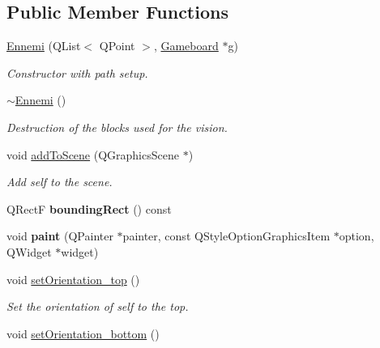 \subsection*{Public Member Functions}
\begin{DoxyCompactItemize}
\item 
\hyperlink{class_ennemi_af86e9134a1cfd8d878305924702b9d7a}{Ennemi} (Q\+List$<$ Q\+Point $>$, \hyperlink{class_gameboard}{Gameboard} $\ast$g)
\begin{DoxyCompactList}\small\item\em Constructor with path setup. \end{DoxyCompactList}\item 
\hypertarget{class_ennemi_adf402a9389efe705c604f91d6e74d00e}{}\hyperlink{class_ennemi_adf402a9389efe705c604f91d6e74d00e}{$\sim$\+Ennemi} ()\label{class_ennemi_adf402a9389efe705c604f91d6e74d00e}

\begin{DoxyCompactList}\small\item\em Destruction of the blocks used for the vision. \end{DoxyCompactList}\item 
\hypertarget{class_ennemi_ae62d1dcf274319710e7ac4495c95a221}{}void \hyperlink{class_ennemi_ae62d1dcf274319710e7ac4495c95a221}{add\+To\+Scene} (Q\+Graphics\+Scene $\ast$)\label{class_ennemi_ae62d1dcf274319710e7ac4495c95a221}

\begin{DoxyCompactList}\small\item\em Add self to the scene. \end{DoxyCompactList}\item 
\hypertarget{class_ennemi_aa00ff90bbb5d71456a23673e77c41bb4}{}Q\+Rect\+F {\bfseries bounding\+Rect} () const \label{class_ennemi_aa00ff90bbb5d71456a23673e77c41bb4}

\item 
\hypertarget{class_ennemi_afbdea6c2e62c2065694a32db0f049325}{}void {\bfseries paint} (Q\+Painter $\ast$painter, const Q\+Style\+Option\+Graphics\+Item $\ast$option, Q\+Widget $\ast$widget)\label{class_ennemi_afbdea6c2e62c2065694a32db0f049325}

\item 
\hypertarget{class_ennemi_a7c509f048996eecb4ee768a044825d15}{}void \hyperlink{class_ennemi_a7c509f048996eecb4ee768a044825d15}{set\+Orientation\+\_\+top} ()\label{class_ennemi_a7c509f048996eecb4ee768a044825d15}

\begin{DoxyCompactList}\small\item\em Set the orientation of self to the top. \end{DoxyCompactList}\item 
\hypertarget{class_ennemi_ab3bbc6381307320c22b1686c5bc59d93}{}void \hyperlink{class_ennemi_ab3bbc6381307320c22b1686c5bc59d93}{set\+Orientation\+\_\+bottom} ()\label{class_ennemi_ab3bbc6381307320c22b1686c5bc59d93}


\end{DoxyCompactItemize}
